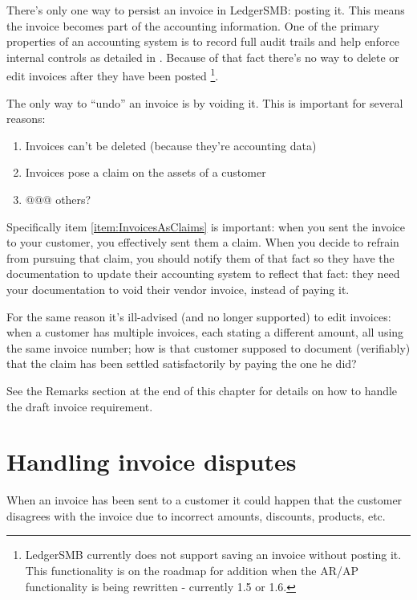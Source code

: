 There's only one way to persist an invoice in LedgerSMB: posting it. This means
the invoice becomes part of the accounting information. One of the primary
properties of an accounting system is to record full audit trails and help enforce
internal controls as detailed in . Because
of that fact there's no way to delete or edit invoices after they have been posted
\footnote{LedgerSMB currently does not support saving an invoice without posting
it. This functionality is on the roadmap for addition when the AR/AP functionality
is being rewritten - currently 1.5 or 1.6.}.

The only way to ``undo'' an invoice is by voiding it. This is important for several
reasons:

\begin{enumerate}
\item Invoices can't be deleted (because they're accounting data)
\item Invoices pose a claim on the assets of a \gls{customer}
\label{item:InvoicesAsClaims}
\item @@@ others?
\end{enumerate}

Specifically item \ref{item:InvoicesAsClaims} is important: when you sent the invoice
to your \gls{customer}, you effectively sent them a claim. When you decide to refrain from
pursuing that claim, you should notify them of that fact so they have the documentation
to update their accounting system to reflect that fact: they need your documentation
to void their vendor invoice, instead of paying it.

For the same reason it's ill-advised (and no longer supported) to edit invoices:
when a \gls{customer} has multiple invoices, each stating a different amount, all
using the same invoice number; how is that \gls{customer} supposed to document (verifiably)
that the claim has been settled satisfactorily by paying the one he did?

See the Remarks section at the end of this chapter for details on how to handle
the draft invoice requirement.

\section{Handling invoice disputes}
\label{sec-business-processes-invoicing-handling-disputes}

When an invoice has been sent to a \gls{customer} it could happen that the customer disagrees
with the invoice due to incorrect amounts, discounts, products, etc.


